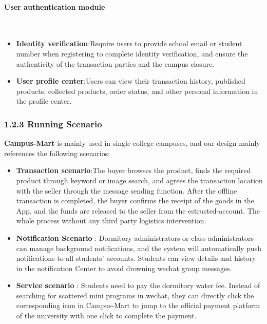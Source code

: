 \documentclass{article}
\begin{document}
\paragraph{User authentication module}\mbox{}\\

\begin{itemize}
    \item \textbf{Identity verification}:Require users to provide school email or student number when registering to complete identity verification, and ensure the authenticity of the transaction parties and the campus closure.
    \item \textbf{User profile center}:Users can view their transaction history, published products, collected products, order status, and other personal information in the profile center.
\end{itemize}

\subsubsection{1.2.3 Running Scenario}

\textbf{Campus-Mart} is mainly used in single college campuses, and our design mainly references the following scenarios:    

\begin{itemize}
    \item \textbf{Transaction scenario}:The buyer browses the product, finds the required product through keyword or image search, and agrees the transaction location with the seller through the message sending function. After the offline transaction is completed, the buyer confirms the receipt of the goods in the App, and the funds are released to the seller from the estrusted-account. The whole process without any third party logistics intervention.
    \item \textbf{ Notification Scenario } : Dormitory administrators or class administrators can manage background notifications, and the system will automatically push notifications to all students' accounts. Students can view details and history in the notification Center to avoid drowning wechat group messages.
    \item \textbf{ Service scenario } : Students need to pay the dormitory water fee. Instead of searching for scattered mini programs in wechat, they can directly click the corresponding icon in Campus-Mart to jump to the official payment platform of the university with one click to complete the payment.
\end{itemize}
\end{document}
